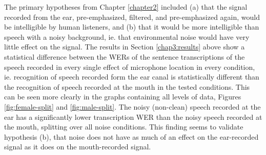 

The primary hypotheses from Chapter \ref{chapter2} included (a) that the signal recorded from the ear, pre-emphasized, filtered, and pre-emphasized again, would be intelligible by human listeners, and (b) that it would be more intelligible than speech with a noisy background, ie. that environmental noise would have very little effect on the signal.  The results in Section \ref{chap3:results} above show a statistical difference between the WERs of the sentence transcriptions of the speech recorded in every single effect of microphone location in every condition, ie. recognition of speech recorded form the ear canal is statistically different than the recognition of speech recorded at the mouth in the tested conditions.  This can be seen more clearly in the graphs containing all levels of data, Figures \ref{fig:female-split} and \ref{fig:male-split}.  The noisy (non-clean) speech recorded at the ear has a significantly lower transcription WER than the noisy speech recorded at the mouth, splitting over all noise conditions.  This finding seems to validate hypothesis (b), that noise does not have as much of an effect on the ear-recorded signal as it does on the mouth-recorded signal.

